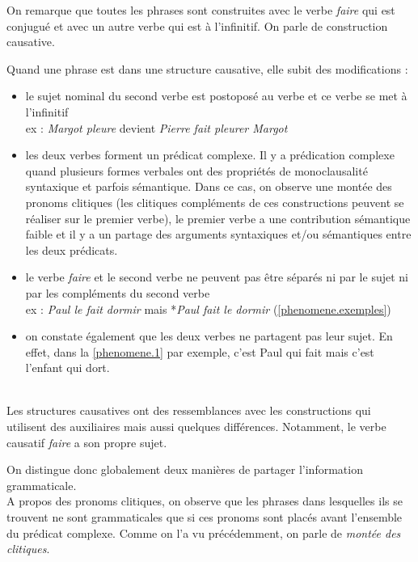 On remarque que toutes les phrases sont construites avec le verbe \emph{faire} qui est conjugué et avec un autre verbe qui est à l'infinitif.
On parle de construction causative.

Quand une phrase est dans une structure causative, elle subit des modifications : \\

\begin{itemize}
  \item le sujet nominal du second verbe est postoposé au verbe et ce verbe se met à l'infinitif\\
    ex : \emph{Margot pleure} devient \emph{Pierre fait pleurer Margot}
  \item les deux verbes forment un prédicat complexe.
    Il y a prédication complexe quand plusieurs formes verbales ont des	propriétés de monoclausalité syntaxique et parfois sémantique.
    Dans ce cas, on observe une montée des pronoms clitiques (les clitiques compléments de ces constructions peuvent se réaliser sur le premier verbe), le premier verbe a une contribution sémantique faible et il y a un partage des arguments syntaxiques et/ou sémantiques entre les deux prédicats.
  \item le verbe \emph{faire} et le second verbe ne peuvent pas être séparés ni par le sujet ni par les compléments du second verbe\\
    ex \label{phenomene.1}: \emph{Paul le fait dormir} mais *\emph{Paul fait le dormir} (\autoref{phenomene.exemples})
  \item on constate également que les deux verbes ne partagent pas leur sujet.
    En effet, dans la \autoref{phenomene.1} par exemple, c'est Paul qui fait mais c'est l'enfant qui dort.
\end{itemize}~{}\\

Les structures causatives ont des ressemblances avec les constructions qui utilisent des auxiliaires mais aussi quelques différences.
Notamment, le verbe causatif \emph{faire} a son propre sujet.

On distingue donc globalement deux manières de partager l'information grammaticale.\\

A propos des pronoms clitiques, on observe que les phrases dans lesquelles ils se trouvent ne sont grammaticales que si ces pronoms sont placés avant l'ensemble du prédicat complexe.
Comme on l'a vu précédemment, on parle de \emph{montée des clitiques}.\\

